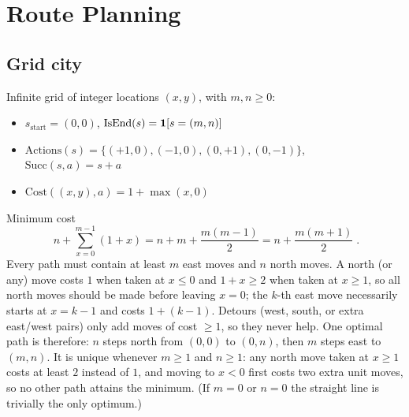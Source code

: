 \section{Route Planning}
\label{sec:route}

\subsection{Grid city}

Infinite grid of integer locations $(x,y)$, with $m,n\ge0$:
\begin{itemize}[nosep]
  \item $s_{\text{start}}=(0,0)$, \quad $\text{IsEnd}(s)=\mathbf{1}[s=(m,n)]$
  \item $\text{Actions}(s)=\{(+1,0),(-1,0),(0,+1),(0,-1)\}$, \quad $\text{Succ}(s,a)=s+a$
  \item $\text{Cost}((x,y),a)=1+\max(x,0)$
\end{itemize}

\begin{solution}
Minimum cost
\[
\boxed{\;n+\sum_{x=0}^{m-1}(1+x)=n+m+\frac{m(m-1)}{2}=n+\frac{m(m+1)}{2}\;}.
\]
Every path must contain at least $m$ east moves and $n$ north moves. A north (or any) move costs $1$ when
taken at $x\le0$ and $1+x\ge2$ when taken at $x\ge1$, so all north moves should be made before leaving $x=0$;
the $k$-th east move necessarily starts at $x=k-1$ and costs $1+(k-1)$. Detours (west, south, or extra
east/west pairs) only add moves of cost $\ge1$, so they never help. One optimal path is therefore: $n$ steps
north from $(0,0)$ to $(0,n)$, then $m$ steps east to $(m,n)$. It is unique whenever $m\ge1$ and $n\ge1$: any
north move taken at $x\ge1$ costs at least $2$ instead of $1$, and moving to $x<0$ first costs two extra
unit moves, so no other path attains the minimum. (If $m=0$ or $n=0$ the straight line is trivially the only
optimum.)
\end{solution}

